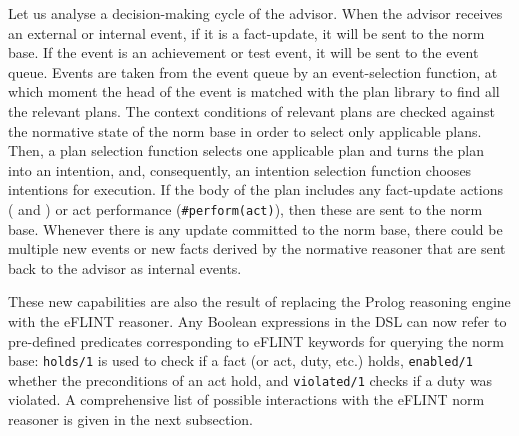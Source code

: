 Let us analyse a decision-making cycle of the advisor. When the advisor receives an external or internal event, if it is a fact-update, it will be sent to the norm base. 
%
If the event is an achievement or test event, it will be sent to the event queue. 
%
Events are taken from the event queue by an event-selection function, at which moment the head of the event is matched with the plan library to find all the relevant plans. 
%
The context conditions of relevant plans are checked against the normative state of the norm base in order to select only applicable plans. 
%
Then, a plan selection function selects one applicable plan and turns the plan into an intention, and, 
%
consequently, an intention selection function chooses intentions for execution. 
%
If the body of the plan includes any fact-update actions ( and ) or act performance  (\texttt{#perform(act)}), then these are sent to the norm base. 
%
Whenever there is any update committed to the norm base, there could be multiple new events or new facts derived by the normative reasoner that are sent back to the advisor as internal events.

%
These new capabilities are also the result of replacing the Prolog reasoning engine with the eFLINT reasoner.
%
Any Boolean expressions in the DSL can now refer to pre-defined predicates corresponding to eFLINT keywords for querying the norm base: \texttt{holds/1} is used to check if a fact (or act, duty, etc.) holds, \texttt{enabled/1} whether the preconditions of an act hold, and \texttt{violated/1} checks if a duty was violated. 
%
A comprehensive list of possible interactions with the eFLINT norm reasoner is given in the next subsection.
%



